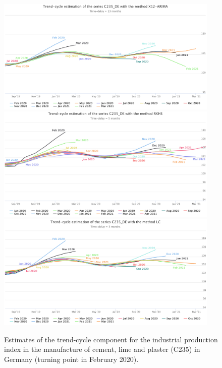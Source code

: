 \documentclass[fleqn,10pt]{latex/stylish_article} %
\newcommand\1{\mathds{1}}
\begin{document}
\normalsize

\begin{figure}\centering
\includegraphics[width=0.95\textwidth]{img/C235DE_x13}
\includegraphics[width=0.95\textwidth]{img/C235DE_rkhs} 
\includegraphics[width=0.95\textwidth]{img/C235DE_lc}
\caption{Estimates of the trend-cycle component for the industrial production index in the manufacture of cement, lime and plaster (C235) in Germany (turning point in February 2020).}
\label{fig:C235DEp1}
\end{figure}
\end{document}
